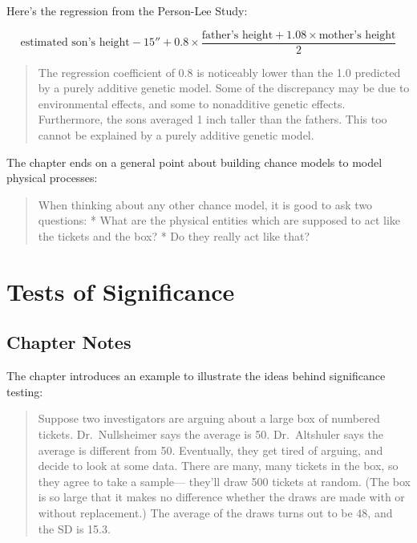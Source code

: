 \documentclass[
]{book}
\begin{document}
Here's the regression from the Person-Lee Study:

\[
\text{estimated son's height} - 15'' + 0.8 \times \frac{\text{father's height} + 1.08 \times \text{mother's height} }{2}
\]

\begin{quote}
The regression coefficient of 0.8 is noticeably lower than the 1.0 predicted by a purely additive genetic model. Some of the discrepancy may be due to environmental effects, and some to nonadditive genetic effects. Furthermore, the sons averaged 1 inch taller than the fathers. This too cannot be explained by a purely additive genetic model.
\end{quote}

The chapter ends on a general point about building chance models to model physical processes:

\begin{quote}
When thinking about any other chance model, it is good to ask two questions:
* What are the physical entities which are supposed to act like the tickets and the box?
* Do they really act like that?
\end{quote}

\hypertarget{tests_significance}{%
\chapter{Tests of Significance}\label{tests_significance}}

\hypertarget{chapter-notes-25}{%
\section{Chapter Notes}\label{chapter-notes-25}}

The chapter introduces an example to illustrate the ideas behind significance testing:

\begin{quote}
Suppose two investigators are arguing about a large box of numbered tickets. Dr.~Nullsheimer says the average is 50. Dr.~Altshuler says the average is different from 50. Eventually, they get tired of arguing, and decide to look at some data. There are many, many tickets in the box, so they agree to take a sample--- they'll draw 500 tickets at random. (The box is so large that it makes no difference whether the draws are made with or without replacement.) The average of the draws turns out to be 48, and the SD is 15.3.
\end{quote}
\end{document}
